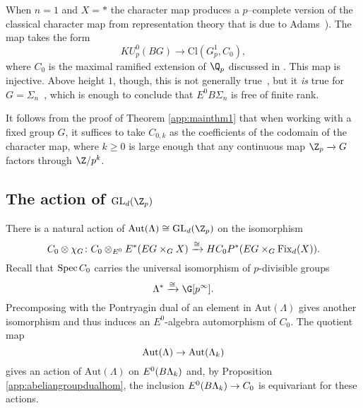 


\begin{example}\label{KUCharacterExample}
When \(n=1\) and \(X = *\) the character map produces a \(p\)--complete version of the classical character map from representation theory that is due to Adams~\cite[Section 2]{AdamsClassifyingSpacesII}). The map takes the form
\[
KU_{p}^{0}(BG) \xrightarrow{} \mathrm{Cl}(G_{p}^{1}, C_0),
\]
where \(C_0\) is the maximal ramified extension of \(\Q_p\) discussed in .  This map is injective.  Above height \(1\), though, this is not generally true~\cite{Kriz}, but it \emph{is} true for $G = \Sigma_n$~\cite[Theorem 7.3]{HKR}, which is enough to conclude that $E^0 B\Sigma_n$ is free of finite rank.
\end{example}

\begin{remark}
It follows from the proof of Theorem \ref{app:mainthm1} that when working with a fixed group \(G\), it suffices to take \(C_{0,k}\) as the coefficients of the codomain of the character map, where \(k \geq 0\) is large enough that any continuous map \(\Z_p \xrightarrow{} G\) factors through \(\Z/p^k\).
\end{remark}

\subsection{The action of \(\mathrm{GL}_d(\Z_p)\)}

There is a natural action of \(\mathrm{Aut}(\Lambda) \cong \mathrm{GL}_d(\Z_p)\) on the isomorphism
\[
C_0 \otimes \chi_G \colon C_0 \otimes_{E^0} E^*(EG \times_G X) \xrightarrow{\cong} HC_{0}P^{*}(EG \times_G \operatorname{Fix}_d(X)).
\]
Recall that \(\operatorname{Spec} C_0\) carries the universal isomorphism of \(p\)-divisible groups
\[
\Lambda^* \xrightarrow{\cong} \G[p^\infty].
\]
Precomposing with the Pontryagin dual of an element in \(\mathrm{Aut}(\Lambda)\) gives another isomorphism and thus induces an \(E^0\)-algebra automorphism of \(C_0\). The quotient map
\[
\mathrm{Aut}(\Lambda) \to \mathrm{Aut}(\Lambda_k)
\]  
gives an action of \(\mathrm{Aut}(\Lambda)\) on \(E^0(B\Lambda_k)\) and, by Proposition \ref{app:abeliangroupdualhom}, the inclusion \(E^0(B\Lambda_k) \to C_0\) is equivariant for these actions.

